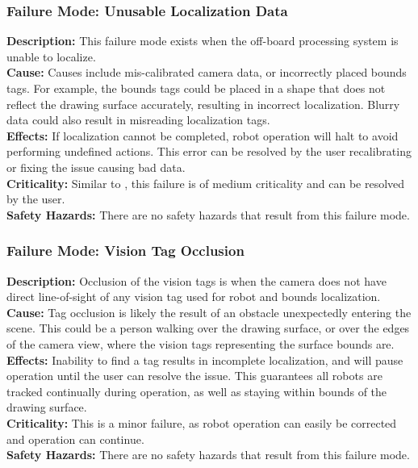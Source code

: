 \subsubsection{Failure Mode: Unusable Localization Data}
\label{sec:localization_fm_unusable}
\textbf{Description:} This failure mode exists when the off-board processing system is unable to localize. \\
\textbf{Cause:} Causes include mis-calibrated camera data, or incorrectly placed bounds tags. For example, the bounds tags could be placed in a shape that does not reflect the drawing surface accurately, resulting in incorrect localization. Blurry data could also result in misreading localization tags.\\
\textbf{Effects:}  If localization cannot be completed, robot operation will halt to avoid performing undefined actions. This error can be resolved by the user recalibrating or fixing the issue causing bad data.\\
\textbf{Criticality:}  Similar to , this failure is of medium criticality and can be resolved by the user.\\
\textbf{Safety Hazards:} There are no safety hazards that result from this failure mode.

\subsubsection{Failure Mode: Vision Tag Occlusion}
\label{sec:localization_fm_occlusion}
\textbf{Description:} Occlusion of the vision tags is when the camera does not have direct line-of-sight of any vision tag used for robot and bounds localization.\\
\textbf{Cause:} Tag occlusion is likely the result of an obstacle unexpectedly entering the scene. This could be a person walking over the drawing surface, or over the edges of the camera view, where the vision tags representing the surface bounds are.\\
\textbf{Effects:} Inability to find a tag results in incomplete localization, and will pause operation until the user can resolve the issue. This guarantees all robots are tracked continually during operation, as well as staying within bounds of the drawing surface. \\
\textbf{Criticality:}  This is a minor failure, as robot operation can easily be corrected and operation can continue.\\
\textbf{Safety Hazards:} There are no safety hazards that result from this failure mode.\\
